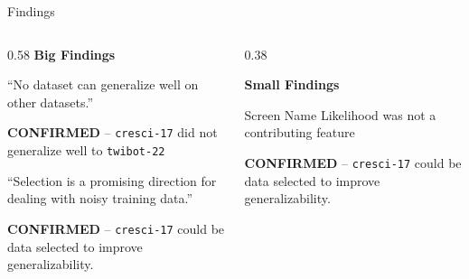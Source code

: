 \documentclass[aspectratio=169, 10pt]{beamer}
\begin{document}
\begin{frame}{Findings}
  \begin{columns}[T]
    \begin{column}{0.58\textwidth}
      \textbf{Big Findings}
      \begin{indentedblock}
        \small ``No dataset can generalize well on other datasets.''
      \end{indentedblock}
      \small \textbf{CONFIRMED} -- \texttt{cresci-17} did not generalize well to \texttt{twibot-22}

      \vspace{0.2cm}
      \begin{indentedblock}
        \small ``Selection is a promising direction for dealing with noisy training data.''
      \end{indentedblock}
      \small \textbf{CONFIRMED} -- \texttt{cresci-17} could be data selected to improve generalizability.
    \end{column}

    \begin{column}{0.38\textwidth}
      \centering

      \textbf{Small Findings}

      \vspace{0.2cm}
      \begin{indentedblock}
        \small Screen Name Likelihood was not a contributing feature
      \end{indentedblock}
      \small \textbf{CONFIRMED} -- \texttt{cresci-17} could be data selected to improve generalizability.
    \end{column}
  \end{columns}
\end{frame}
\end{document}
